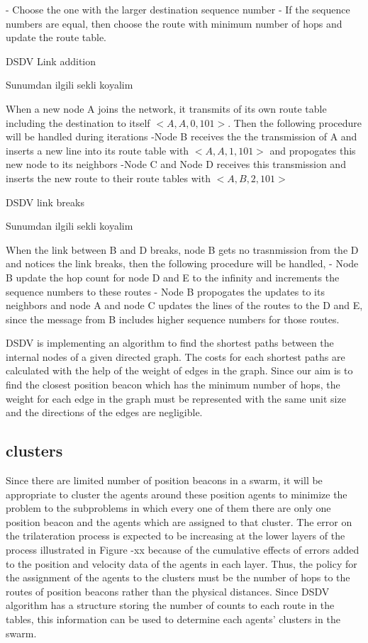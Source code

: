 \documentclass[twoside]{article}
\begin{document}
\begin{multicols}{2}
	- Choose the one with the larger destination sequence number
	- If the sequence numbers are equal, then choose the route with minimum number of hops and update the route table.
	
	DSDV Link addition
	
	Sunumdan ilgili sekli koyalim
	
	When a new node A joins the network, it transmits of its own route table including the destination to itself $<A,A,0,101>$. Then the following procedure will be handled during iterations
	-Node B receives the the transmission of A and inserts a new line into its route table with $<A,A,1,101>$ and propogates this new node to its neighbors
	-Node C and Node D receives this transmission and inserts the new route to their route tables with $<A,B,2,101>$
	
	
	DSDV link breaks
	
	Sunumdan ilgili sekli koyalim
	
	When the link between B and D breaks, node B gets no trasnmission from the D and notices the link breaks, then the following procedure will be handled,
	- Node B update the hop count for node D and E to the infinity and increments the sequence numbers to these routes 
	- Node B propogates the updates to its neighbors and node A and node C updates the lines of the routes to the D and E, since the message from B includes higher sequence numbers for those routes. 
	
	DSDV is implementing an algorithm to find the shortest paths between the internal nodes of a given directed graph. The costs for each shortest paths are calculated with the help of the weight of edges in the graph. Since our aim is to find the closest position beacon which has the minimum number of hops, the weight for each edge in the graph must be represented with the same unit size and the directions of the edges are negligible. 
	\subsection{clusters}
	Since there are limited number of position beacons in a swarm, it will be appropriate to cluster the agents around these position agents to minimize the problem to the subproblems in which every one of them there are only one position beacon and the agents which are assigned to that cluster. The error on the trilateration process is expected to be increasing at the lower layers of the process illustrated in Figure -xx because of the cumulative effects of errors added to the position and velocity data of the agents in each layer. Thus, the policy for the assignment of the agents to the clusters must be the number of hops to the routes of position beacons rather than the physical distances. Since DSDV algorithm has a structure storing the number of counts to each route in the tables, this information can be used to determine each agents' clusters in the swarm. 
	

\end{multicols}
\end{document}
